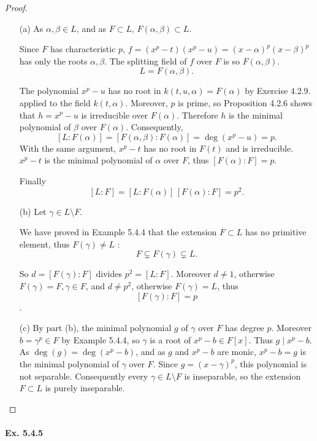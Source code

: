 \documentclass[11pt,a4paper]{article}
\begin{document}
\begin{proof}

\begin{enumerate}
\item[(a)]
As $\alpha,\beta\in L$, and as $F\subset L$, $F(\alpha,\beta)\subset L$.

Since $F$ has characteristic $p$, $f=(x^p-t)(x^p-u)  = (x-\alpha)^p(x-\beta)^p$ has only the roots $\alpha,\beta$. The splitting field of $f$ over $F$ is so $F(\alpha,\beta)$.
$$L = F(\alpha,\beta).$$

The polynomial $x^p -u$ has no root in  $k(t,u,\alpha) = F(\alpha)$ by Exercise 4.2.9. applied to the field $k(t,\alpha)$. Moreover, $p$ is prime, so Proposition 4.2.6 shows that $h=x^p-u$ is irreducible over $F(\alpha)$. Therefore $h$ is the minimal polynomial of $\beta$ over $F(\alpha)$. Consequently, 
 $$[L : F(\alpha)] = [F(\alpha,\beta):F(\alpha)] = \deg(x^p-u) = p.$$
 With the same argument, $x^p - t$ has no root in  $F(t)$ and is irreducible. $x^p-t$ is the minimal polynomial of $\alpha$ over $F$, thus $[F(\alpha):F] = p$.
 
Finally
 $$[L:F] = [L : F(\alpha)]\, [F(\alpha):F] = p^2.$$
 
\item[(b)]
Let $\gamma \in L\setminus F$.

We have proved in Example 5.4.4 that the extension $F \subset L$ has no primitive element, thus $F(\gamma) \neq L$ :
$$F \subsetneq F(\gamma)\subsetneq L.$$

So $d= [F(\gamma) : F]$ divides $p^2 = [L:F]$. Moreover $d\ne 1$, otherwise $F(\gamma) = F, \gamma \in F$, and $d \ne p^2$, otherwise $F(\gamma) = L$, thus
$$[F(\gamma) : F] = p$$.

\item[(c)]
By part (b), the minimal polynomial $g$ of  $\gamma$ over $F$ has degree $p$. Moreover $b = \gamma^p \in F$ by Example 5.4.4, so $\gamma$ is a root of $x^p -b \in F[x]$. Thus $g \mid x^p-b$. As $\deg(g) = \deg(x^p-b)$, and as $g$ and  $x^p-b$ are monic, $x^p-b =g$ is the minimal polynomial of $\gamma$ over $F$. Since $g = (x-\gamma)^p$, this polynomial is not separable. Consequently every $\gamma \in L\setminus F$ is inseparable, so the extension $F \subset L $ is purely inseparable.

\end{enumerate}
\end{proof}

\paragraph{Ex. 5.4.5}
\end{document}

